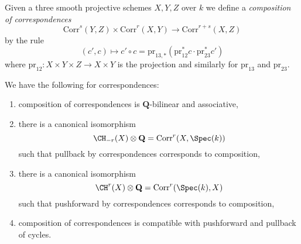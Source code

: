 \medskip\noindent
Given a three smooth projective schemes $X, Y, Z$ over $k$ we define a
{\it composition of correspondences}
$$
\text{Corr}^s(Y, Z)
\times
\text{Corr}^r(X, Y)
\longrightarrow
\text{Corr}^{r + s}(X, Z)
$$
by the rule
$$
(c', c)
\longmapsto
c' \circ c =
\text{pr}_{13, *}(\text{pr}_{12}^*c \cdot \text{pr}_{23}^*c')
$$
where $\text{pr}_{12} : X \times Y \times Z \to X \times Y$
is the projection and similarly for $\text{pr}_{13}$ and $\text{pr}_{23}$.

\begin{lemma}
\label{lemma-composition-correspondences}
We have the following for correspondences:
\begin{enumerate}
\item composition of correspondences is $\mathbf{Q}$-bilinear
and associative,
\item there is a canonical isomorphism
$$
\CH_{-r}(X) \otimes \mathbf{Q} = \text{Corr}^r(X, \Spec(k))
$$
such that pullback by correspondences corresponds to composition,
\item there is a canonical isomorphism
$$
\CH^r(X) \otimes \mathbf{Q} = \text{Corr}^r(\Spec(k), X)
$$
such that pushforward by correspondences corresponds to composition,
\item composition of correspondences is compatible with pushforward and
pullback of cycles.
\end{enumerate}
\end{lemma}

